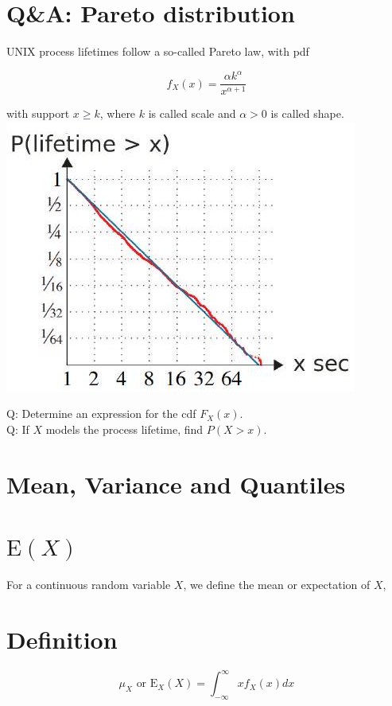 \documentclass[10pt]{article}
\begin{document}
\section*{Q\&A: Pareto distribution}
UNIX process lifetimes follow a so-called Pareto law, with pdf

$$
f_{X}(x)=\frac{\alpha k^{\alpha}}{x^{\alpha+1}}
$$

with support $x \geq k$, where $k$ is called scale and $\alpha>0$ is called shape.\\
\includegraphics[max width=\textwidth, center]{2025_05_11_1201cfe24e14b364b4ecg-10}

Q: Determine an expression for the cdf $F_{X}(x)$.\\
Q: If $X$ models the process lifetime, find $P(X>x)$.

\section*{Mean, Variance and Quantiles}
\section*{$\mathrm{E}(X)$}
For a continuous random variable $X$, we define the mean or expectation of $X$,

\section*{Definition}
$$
\mu_{X} \text { or } \mathrm{E}_{X}(X)=\int_{-\infty}^{\infty} x f_{X}(x) d x
$$
\end{document}
